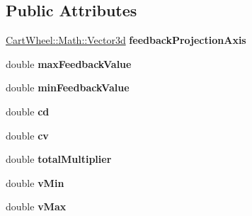 \subsection*{Public Attributes}
\begin{DoxyCompactItemize}
\item 
\hypertarget{classCartWheel_1_1Core_1_1DoubleStanceFeedback_adf64cd50480a9154af63affdc567bde9}{
\hyperlink{classCartWheel_1_1Math_1_1Vector3d}{CartWheel::Math::Vector3d} {\bfseries feedbackProjectionAxis}}
\label{classCartWheel_1_1Core_1_1DoubleStanceFeedback_adf64cd50480a9154af63affdc567bde9}

\item 
\hypertarget{classCartWheel_1_1Core_1_1DoubleStanceFeedback_a94c496e84c2487df4a3030ad831fa92c}{
double {\bfseries maxFeedbackValue}}
\label{classCartWheel_1_1Core_1_1DoubleStanceFeedback_a94c496e84c2487df4a3030ad831fa92c}

\item 
\hypertarget{classCartWheel_1_1Core_1_1DoubleStanceFeedback_aa8cbc14886f11bbebef3f4ec0c9a2fb7}{
double {\bfseries minFeedbackValue}}
\label{classCartWheel_1_1Core_1_1DoubleStanceFeedback_aa8cbc14886f11bbebef3f4ec0c9a2fb7}

\item 
\hypertarget{classCartWheel_1_1Core_1_1DoubleStanceFeedback_a9aa5778819f1964f32ea6fd7d5c1600f}{
double {\bfseries cd}}
\label{classCartWheel_1_1Core_1_1DoubleStanceFeedback_a9aa5778819f1964f32ea6fd7d5c1600f}

\item 
\hypertarget{classCartWheel_1_1Core_1_1DoubleStanceFeedback_a550d0faf1d1f60e31758b412adc4d23f}{
double {\bfseries cv}}
\label{classCartWheel_1_1Core_1_1DoubleStanceFeedback_a550d0faf1d1f60e31758b412adc4d23f}

\item 
\hypertarget{classCartWheel_1_1Core_1_1DoubleStanceFeedback_a5eda84d89cb12815fe0282e9e5775cce}{
double {\bfseries totalMultiplier}}
\label{classCartWheel_1_1Core_1_1DoubleStanceFeedback_a5eda84d89cb12815fe0282e9e5775cce}

\item 
\hypertarget{classCartWheel_1_1Core_1_1DoubleStanceFeedback_ae72d34e0dc5d16d7e60b3d0f1af3a41b}{
double {\bfseries vMin}}
\label{classCartWheel_1_1Core_1_1DoubleStanceFeedback_ae72d34e0dc5d16d7e60b3d0f1af3a41b}

\item 
\hypertarget{classCartWheel_1_1Core_1_1DoubleStanceFeedback_ab95e45f5abb98617abd2f2548704a2e1}{
double {\bfseries vMax}}
\label{classCartWheel_1_1Core_1_1DoubleStanceFeedback_ab95e45f5abb98617abd2f2548704a2e1}


\end{DoxyCompactItemize}
